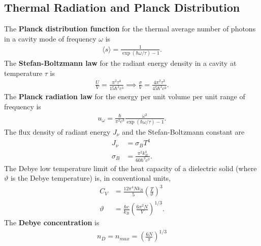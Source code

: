 \begin{multicols}{2}
	\section{Thermal Radiation and Planck Distribution}
	The \textbf{Planck distribution function} for the thermal average number of photons in a cavity mode of frequency $\omega$ is
	\begin{align}
		\langle s \rangle = \frac{1}{\exp(\hbar \omega/\tau)-1}.
	\end{align}
	The \textbf{Stefan-Boltzmann law} for the radiant energy density in a cavity at temperature $\tau$ is
	\begin{align}
		\frac{U}{V} = \frac{\pi^2\tau^4}{15\hbar^3 c^3} \implies \frac{\sigma}{V} = \frac{4\pi^2\tau^3}{45\hbar^3 c^3}.	
	\end{align}
	The \textbf{Planck radiation law} for the energy per unit volume per unit range of frequency is
	\begin{align}
		u_\omega = \frac{\hbar}{\pi^2c^3}\frac{\omega^3}{\exp(\hbar \omega/\tau)-1}.
	\end{align}
	The flux density of radiant energy $J_\nu$ and the Stefan-Boltzmann constant are
	\begin{align}
		J_\nu &= \sigma_BT^4 \\
		\sigma_B &= \frac{\pi^2k_B^4}{60\hbar^3c^3}.
	\end{align}
	The Debye low temperature limit of the heat capacity of a dielectric solid (where $\vartheta$ is the Debye temperature) is, in conventional units,
	\begin{align}
		C_V &= \frac{12\pi^4Nk_B}{5}\left(\frac{T}{\vartheta}\right)^3 \\
		\vartheta &= \frac{\hbar c}{k_B}\left(\frac{6\pi^2N}{V}\right)^{1/3}.
	\end{align}
	The \textbf{Debye concentration} is
	\begin{align}
		n_D=n_{max} = \left(\frac{6N}{\pi}\right)^{1/3}
	\end{align}

\end{multicols}
